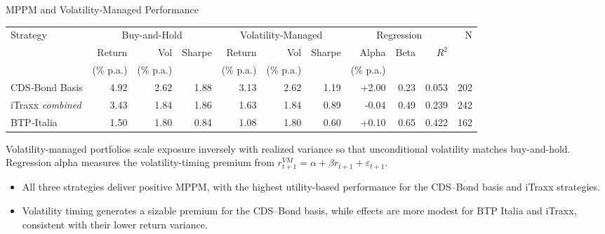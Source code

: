 \documentclass[aspectratio=169,11pt]{beamer}
\begin{document}
\begin{frame}[t,shrink=15]{MPPM and Volatility-Managed Performance}
\begin{threeparttable}
\begin{tabular}{lrrrrrrrrrr}
\toprule
Strategy & \multicolumn{3}{c}{Buy-and-Hold} & \multicolumn{3}{c}{Volatility-Managed} & \multicolumn{3}{c}{Regression} & N \\
\cmidrule(lr){2-4} \cmidrule(lr){5-7} \cmidrule(lr){8-10}
& Return & Vol & Sharpe & Return & Vol & Sharpe & Alpha & Beta & $R^2$ & \\
& (\% p.a.) & (\% p.a.) & & (\% p.a.) & (\% p.a.) & & (\% p.a.) & & & \\
\midrule
CDS\textit{-}Bond Basis   & 4.92 & 2.62 & 1.88 & 3.13 & 2.62 & 1.19 & +2.00 & 0.23 & 0.053 & 202 \\
iTraxx \textit{combined}  & 3.43 & 1.84 & 1.86 & 1.63 & 1.84 & 0.89 & -0.04 & 0.49 & 0.239 & 242 \\
BTP\textit{-}Italia       & 1.50 & 1.80 & 0.84 & 1.08 & 1.80 & 0.60 & +0.10 & 0.65 & 0.422 & 162 \\
\bottomrule
\end{tabular}
\begin{tablenotes}
\tiny
\item Volatility-managed portfolios scale exposure inversely with realized variance so that unconditional volatility matches buy-and-hold. Regression alpha measures the volatility-timing premium from $r^{VM}_{t+1} = \alpha + \beta r_{t+1} + \varepsilon_{t+1}$.
\end{tablenotes}
\end{threeparttable}

\vspace{0.15cm}

\tiny
\begin{itemize}
  \item All three strategies deliver positive MPPM, with the highest utility-based performance for the CDS--Bond basis and iTraxx strategies.
  \item Volatility timing generates a sizable premium for the CDS--Bond basis, while effects are more modest for BTP Italia and iTraxx, consistent with their lower return variance.
\end{itemize}

\end{frame}
\end{document}
